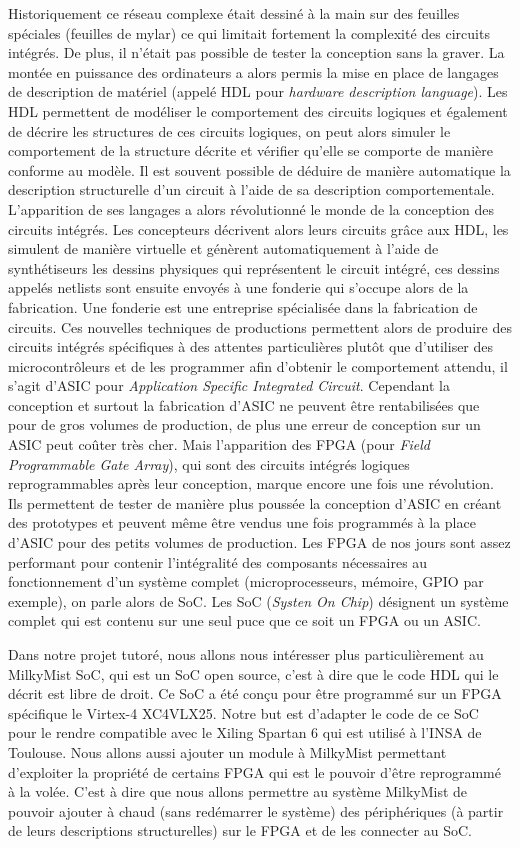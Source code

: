 Historiquement ce réseau complexe était dessiné à la main sur des feuilles spéciales
(feuilles de mylar) ce qui limitait fortement la complexité des circuits intégrés. De
plus, il n'était pas possible de tester la conception sans la graver. La montée en
puissance des ordinateurs a alors permis la mise en place de langages de description
de matériel (appelé HDL pour \textit{hardware description language}). Les HDL
permettent de modéliser le comportement des circuits logiques et également de décrire
les structures de ces circuits logiques, on peut alors simuler le comportement de la
structure décrite et vérifier qu'elle se comporte de manière conforme au modèle. Il
est souvent possible de déduire de manière automatique la description structurelle
d'un circuit à l'aide de sa description comportementale. L'apparition de ses langages
a alors révolutionné le monde de la conception des circuits intégrés. Les concepteurs
décrivent alors leurs circuits grâce aux HDL, les simulent de manière virtuelle et
génèrent automatiquement à l'aide de synthétiseurs les dessins physiques qui
représentent le circuit intégré, ces dessins appelés netlists sont ensuite envoyés à
une fonderie qui s'occupe alors de la fabrication. Une fonderie est une entreprise
spécialisée dans la fabrication de circuits. Ces nouvelles techniques de productions
permettent alors de produire des circuits intégrés spécifiques à des attentes
particulières plutôt que d'utiliser des microcontrôleurs et de les programmer afin
d'obtenir le comportement attendu, il s'agit d'ASIC pour \textit{Application Specific
Integrated Circuit}. Cependant la conception et surtout la fabrication d'ASIC ne
peuvent être rentabilisées que pour de gros volumes de production, de plus une erreur
de conception sur un ASIC peut coûter très cher. Mais l'apparition des FPGA (pour
\textit{Field Programmable Gate Array}), qui sont des circuits intégrés logiques
reprogrammables après leur conception, marque encore une fois une révolution.  Ils
permettent de tester de manière plus poussée la conception d'ASIC en créant des
prototypes et peuvent même être vendus une fois programmés à la place d'ASIC pour des
petits volumes de production. Les FPGA de nos jours sont assez performant pour
contenir l'intégralité des composants nécessaires au fonctionnement d'un système
complet (microprocesseurs, mémoire, GPIO par exemple), on parle alors de SoC. Les SoC
(\textit{Systen On Chip}) désignent un système complet qui est contenu sur une seul
puce que ce soit un FPGA ou un ASIC.

Dans notre projet tutoré, nous allons nous intéresser plus particulièrement au
MilkyMist SoC, qui est un SoC open source, c'est à dire que le code HDL qui le décrit
est libre de droit.  Ce SoC a été conçu pour être programmé sur un FPGA spécifique le
Virtex-4 XC4VLX25.  Notre but est d'adapter le code de ce SoC pour le rendre
compatible avec le Xiling Spartan 6 qui est utilisé à l'INSA de Toulouse.  Nous
allons aussi ajouter un module à MilkyMist permettant d'exploiter la propriété de
certains FPGA qui est le pouvoir d'être reprogrammé à la volée. C'est à dire que nous
allons permettre au système MilkyMist de pouvoir ajouter à chaud (sans redémarrer le
système) des périphériques (à partir de leurs descriptions structurelles) sur le FPGA
et de les connecter au SoC. 

